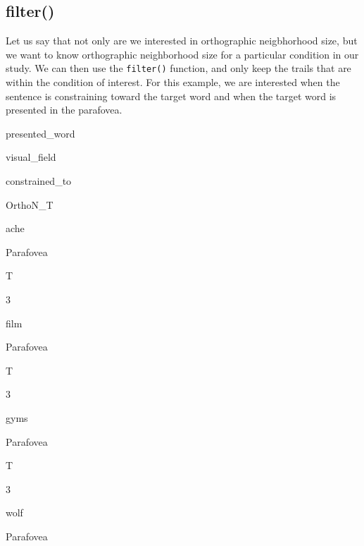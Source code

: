 \documentclass[]{book}
\newenvironment{Shaded}{\begin{snugshade}}{\end{snugshade}}
\newcommand{\KeywordTok}[1]{\textcolor[rgb]{0.13,0.29,0.53}{\textbf{#1}}}
\newcommand{\DataTypeTok}[1]{\textcolor[rgb]{0.13,0.29,0.53}{#1}}
\newcommand{\StringTok}[1]{\textcolor[rgb]{0.31,0.60,0.02}{#1}}
\newcommand{\OperatorTok}[1]{\textcolor[rgb]{0.81,0.36,0.00}{\textbf{#1}}}
\newcommand{\NormalTok}[1]{#1}
\begin{document}
\subsection{filter()}\label{filter}

Let us say that not only are we interested in orthographic neigbhorhood
size, but we want to know orthographic neighborhood size for a
particular condition in our study. We can then use the \texttt{filter()}
function, and only keep the trails that are within the condition of
interest. For this example, we are interested when the sentence is
constraining toward the target word and when the target word is
presented in the parafovea.

\begin{Shaded}
\end{Shaded}

presented\_word

visual\_field

constrained\_to

OrthoN\_T

ache

Parafovea

T

3

film

Parafovea

T

3

gyms

Parafovea

T

3

wolf

Parafovea
\end{document}
